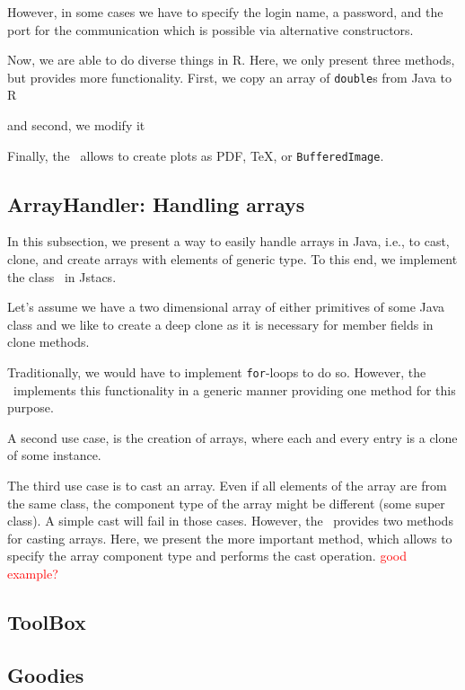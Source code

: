 \addtocounter{off}{7}

However, in some cases we have to specify the login name, a password, and the port for the communication which is possible via alternative constructors.

Now, we are able to do diverse things in R. Here, we only present three methods, but \REnvironment provides more functionality. First, we copy an array of \lstinline+double+s from Java to R 

\addtocounter{off}{4}

and second, we modify it 


Finally, the \REnvironment~allows to create plots as PDF, TeX, or \lstinline+BufferedImage+. 

\addtocounter{off}{3}

\subsection{ArrayHandler: Handling arrays}

In this subsection, we present a way to easily handle arrays in Java, i.e., to cast, clone, and create arrays with elements of generic type. To this end, we implement the class \ArrayHandler~in Jstacs. 

Let's assume we have a two dimensional array of either primitives of some Java class and we like to create a deep clone as it is necessary for member fields in clone methods.

\addtocounter{off}{2}

Traditionally, we would have to implement \lstinline+for+-loops to do so. However, the \ArrayHandler~implements this functionality in a generic manner providing one method for this purpose.

\addtocounter{off}{2}

A second use case, is the creation of arrays, where each and every entry is a clone of some instance.

\addtocounter{off}{3}

The third use case is to cast an array. Even if all elements of the array are from the same class, the component type of the array might be different (some super class). A simple cast will fail in those cases. However, the \ArrayHandler~provides two methods for casting arrays. Here, we present the more important method, which allows to specify the array component type and performs the cast operation. \textcolor{red}{good example?}

\addtocounter{off}{4}

\subsection{ToolBox}

\addtocounter{off}{3}

\addtocounter{off}{3}

\addtocounter{off}{3}

\subsection{Goodies}

\addtocounter{off}{3}

\addtocounter{off}{7}
